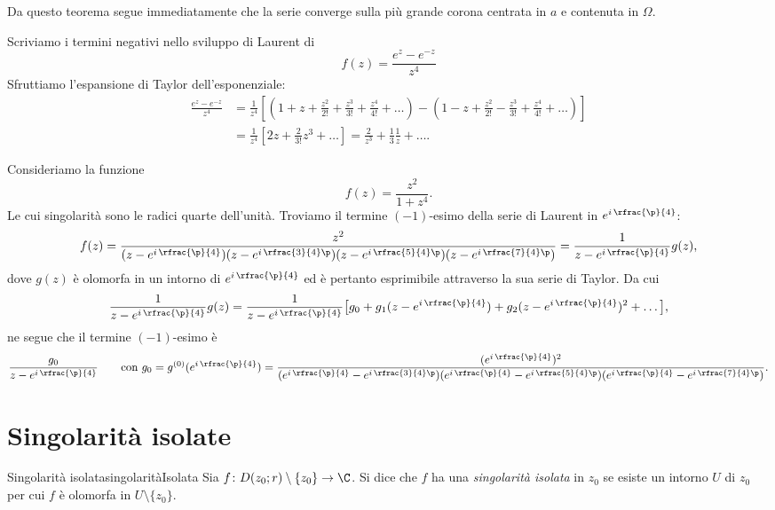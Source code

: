 \begin{oss}
	Da questo teorema segue immediatamente che la serie converge sulla più grande corona centrata in \(a\) e contenuta in \(\Omega\).
\end{oss}

\begin{ese}
	Scriviamo i termini negativi nello sviluppo di Laurent di
	\[
		f(z) = \frac{e^z - e^{-z}}{z^4}
	\]
	Sfruttiamo l'espansione di Taylor dell'esponenziale:
	\[
		\begin{split}
			\frac{e^z-e^{-z}}{z^4} & = \frac{1}{z^4} \left[ \left( 1+z+\frac{z^2}{2!}+\frac{z^3}{3!}+\frac{z^4}{4!}+\ldots \right)-\left( 1-z+\frac{z^2}{2!}-\frac{z^3}{3!}+\frac{z^4}{4!}+\ldots \right) \right]\\
			& = \frac{1}{z^4} \left[ 2z+\frac{2}{3!}z^3+\ldots \right] = \frac{2}{z^3}+\frac{1}{3}\frac{1}{z}+ \ldots.
		\end{split}
	\]
\end{ese}

\begin{ese}
	Consideriamo la funzione
	\[
		f(z) = \frac{z^2}{1+z^4}.
	\]
	Le cui singolarità sono le radici quarte dell'unità. Troviamo il termine \((-1)\)-esimo della serie di Laurent in \(e^{i\,\rfrac{\p}{4}}\):
	\[
		f(z) = \frac{z^2}{(z-e^{i\,\rfrac{\p}{4}})(z-e^{i\,\rfrac{3}{4}\p})(z-e^{i\,\rfrac{5}{4}\p})(z-e^{i\,\rfrac{7}{4}\p})} = \frac{1}{z-e^{i\,\rfrac{\p}{4}}} g(z),
	\]
	dove \(g(z)\) è olomorfa in un intorno di \(e^{i\,\rfrac{\p}{4}}\) ed è pertanto esprimibile attraverso la sua serie di Taylor. Da cui
	\[
		\frac{1}{z-e^{i\,\rfrac{\p}{4}}} g(z) = \frac{1}{z-e^{i\,\rfrac{\p}{4}}} \big[g_0+g_1 (z-e^{i\,\rfrac{\p}{4}})+g_2 (z-e^{i\,\rfrac{\p}{4}})^2+\ldots\big],
	\]
	ne segue che il termine \((-1)\)-esimo è
	\[
		\frac{g_0}{z-e^{i\,\rfrac{\p}{4}}} \qquad\text{con }g_0 =g^{(0)}(e^{i\,\rfrac{\p}{4}})= \frac{(e^{i\,\rfrac{\p}{4}})^2}{(e^{i\,\rfrac{\p}{4}}-e^{i\,\rfrac{3}{4}\p})(e^{i\,\rfrac{\p}{4}}-e^{i\,\rfrac{5}{4}\p})(e^{i\,\rfrac{\p}{4}}-e^{i\,\rfrac{7}{4}\p})}.
	\]
\end{ese}
\section{Singolarità isolate}

\begin{defn}{Singolarità isolata}{singolaritàIsolata}
	Sia \(f\colon D(z_0;r)\setminus\{z_0\} \to \C\). Si dice che \(f\) ha una \emph{singolarità isolata} in \(z_0\) se esiste un intorno \(U\) di \(z_0\) per cui \(f\) è olomorfa in \(U\setminus\{z_0\}\).
\end{defn}


